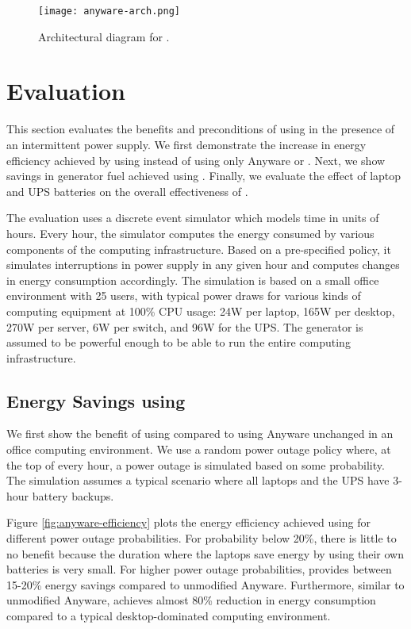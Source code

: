 \begin{figure}[h!]
\centering
\texttt{[image: anyware-arch.png]}
\caption{Architectural diagram for \anywaredc{}.}
\label{fig:anyware-arch}
\end{figure}



\section{Evaluation}
\label{sec:evaluation}

This section evaluates the benefits and preconditions of using \anywaredc{}
in the presence of an intermittent power supply.
We first demonstrate the increase in
energy efficiency achieved by using \anywaredc{} instead of using only Anyware or
\anywareups{}.
Next, we show savings in generator fuel achieved using \anywaredc{}.
Finally, we evaluate the effect of laptop and UPS 
batteries on the overall effectiveness of \anywaredc{}.

The evaluation uses a discrete event simulator which models time in 
units of hours. Every hour, the simulator computes the energy consumed by 
various components of the computing infrastructure. Based on a pre-specified
policy, it simulates interruptions in power supply in any given hour 
and computes changes in energy consumption accordingly. The simulation is based on 
a small office environment with 25 users, with typical power draws for various
kinds of computing equipment at 100\% CPU usage: 24W per laptop, 
165W per desktop, 270W per server, 6W per switch, and 96W for the UPS. 
The generator is assumed to be powerful enough to be able to run the
entire computing infrastructure. 

\subsection{Energy Savings using \anywaredc{}}
\label{sec:energy_savings}

We first show the benefit of using \anywaredc{} compared to using
Anyware unchanged in an office computing environment. We use a random power
outage policy where, at the top of every hour, a power outage is simulated
based on some probability. The simulation assumes a typical scenario where
all laptops and the UPS have 3-hour battery backups.

Figure \ref{fig:anyware-efficiency} plots the
energy efficiency achieved using \anywaredc{} for different power outage
probabilities. For probability below 20\%, there is little to no benefit 
because the duration where the laptops save energy by using their own batteries
is very small. For higher power outage probabilities, \anywaredc{} provides
between 15-20\% energy savings compared to unmodified Anyware. Furthermore,
similar to unmodified Anyware, \anywaredc{} achieves almost 80\% reduction in 
energy consumption compared to a typical desktop-dominated computing environment.


